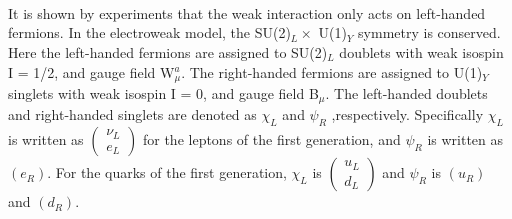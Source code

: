\\ \\

\noindent\textbf{} \\
It is shown by experiments that the weak interaction only acts on left-handed fermions. In the electroweak model, the SU(2)$_L \times$ U(1)$_Y$ symmetry is conserved. Here the left-handed fermions are assigned to SU(2)$_L$ doublets with weak isospin I = 1/2, and gauge field W$^a_\mu$. The right-handed fermions are assigned to  U(1)$_Y$ singlets with weak isospin I = 0, and gauge field B$_\mu$.
The left-handed doublets and right-handed singlets are denoted as $\chi_{L}$ and $\psi_{R}$ ,respectively. Specifically $\chi_{L}$ is written as 
$
\left(\begin{array}{c}
\nu_{L} \\
e_{L}
\end{array}\right)
$
for the leptons of the first generation, and $\psi_{R}$ is written as $(e_R)$.
For the quarks of the first generation, $\chi_{L}$ is 
$
\left(\begin{array}{c}
u_{L} \\
d_{L}
\end{array}\right)
$
and $\psi_{R}$ is $(u_R)$ and $(d_R)$.




